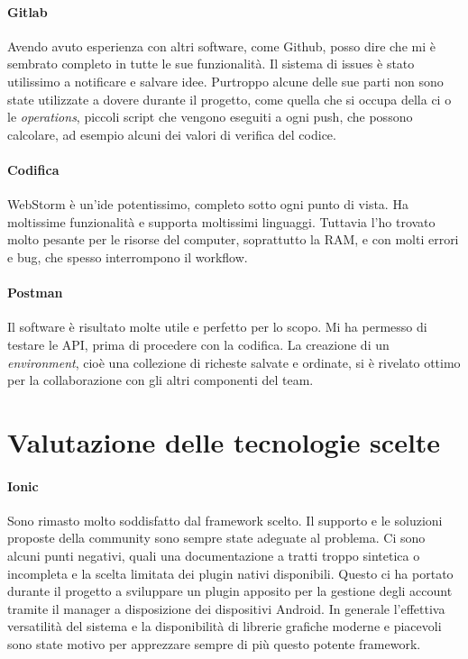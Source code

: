 \paragraph{Gitlab} Avendo avuto esperienza con altri software, come Github, posso dire che mi è sembrato completo in
tutte le sue funzionalità. Il sistema di issues è stato utilissimo a notificare e salvare idee. Purtroppo alcune delle
sue parti non sono state utilizzate a dovere durante il progetto, come quella che si occupa della \gls{ci} o le
\textit{operations}, piccoli script che vengono eseguiti a ogni push, che possono calcolare, ad esempio alcuni dei
valori di verifica del codice. 

\paragraph{Codifica} WebStorm è un'\gls{ide} potentissimo, completo sotto ogni punto di vista. Ha moltissime
funzionalità e supporta moltissimi linguaggi. Tuttavia l'ho trovato molto pesante per le risorse del computer,
soprattutto la RAM, e con molti errori e bug, che spesso interrompono il workflow. 

\paragraph{Postman} Il software è risultato molte utile e perfetto per lo scopo. Mi ha permesso di testare le API, prima
di procedere con la codifica. La creazione di un \textit{environment}, cioè una collezione di richeste salvate e
ordinate, si è rivelato ottimo per la collaborazione con gli altri componenti del team.

\section{Valutazione delle tecnologie scelte}
\paragraph{Ionic} Sono rimasto molto soddisfatto dal framework scelto. Il supporto e le soluzioni proposte della community sono
sempre state adeguate al problema. Ci sono alcuni punti negativi, quali una documentazione a tratti troppo sintetica o
incompleta e la scelta limitata dei plugin nativi disponibili. Questo ci ha portato durante il progetto a sviluppare un
plugin apposito per la gestione degli account tramite il manager a disposizione dei dispositivi Android. In generale
l'effettiva versatilità del sistema e la disponibilità di librerie grafiche moderne e piacevoli sono state motivo per
apprezzare sempre di più questo potente framework.

